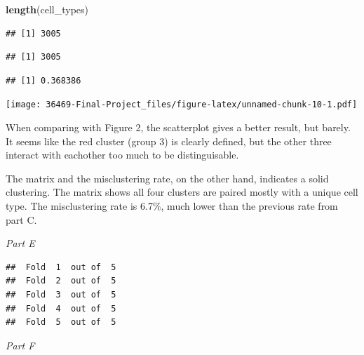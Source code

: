 \documentclass[]{article}
\newenvironment{Shaded}{\begin{snugshade}}{\end{snugshade}}
\newcommand{\KeywordTok}[1]{\textcolor[rgb]{0.13,0.29,0.53}{\textbf{#1}}}
\newcommand{\NormalTok}[1]{#1}
\newcommand{\OperatorTok}[1]{\textcolor[rgb]{0.81,0.36,0.00}{\textbf{#1}}}
\begin{document}
\begin{Shaded}
\begin{Highlighting}[]
\KeywordTok{length}\NormalTok{(cell_types)}
\end{Highlighting}
\end{Shaded}

\begin{verbatim}
## [1] 3005
\end{verbatim}

\begin{Shaded}
\end{Shaded}

\begin{verbatim}
## [1] 3005
\end{verbatim}

\begin{Shaded}
\end{Shaded}

\begin{verbatim}
## [1] 0.368386
\end{verbatim}

\texttt{[image: 36469-Final-Project\_files/figure-latex/unnamed-chunk-10-1.pdf]}

When comparing with Figure 2, the scatterplot gives a better result, but
barely. It seems like the red cluster (group 3) is clearly defined, but
the other three interact with eachother too much to be distinguisable.

The matrix and the misclustering rate, on the other hand, indicates a
solid clustering. The matrix shows all four clusters are paired mostly
with a unique cell type. The misclustering rate is 6.7\%, much lower
than the previous rate from part C.

\emph{Part E}

\begin{verbatim}
##  Fold  1  out of  5 
##  Fold  2  out of  5 
##  Fold  3  out of  5 
##  Fold  4  out of  5 
##  Fold  5  out of  5
\end{verbatim}

\emph{Part F}
\end{document}
